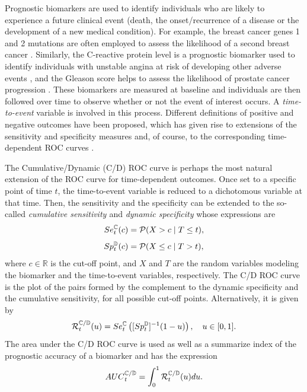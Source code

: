 Prognostic biomarkers are used to identify individuals who are likely to experience a future clinical event (death, the onset/recurrence of a disease or the development of a new medical condition). For example, the breast cancer genes 1 and 2 mutations are often employed to assess the likelihood of a second breast cancer \citep{Basu2015}. Similarly, the C-reactive protein level is a prognostic biomarker used to identify individuals with unstable angina at risk of developing other adverse events \citep{Ferreiros1999}, and the Gleason score helps to assess the likelihood of prostate cancer progression \citep{Epstein2016}. These biomarkers are measured at baseline and individuals are then followed over time to observe whether or not the event of interest occurs. 
A {\it{time-to-event}} variable is involved in this process. Different definitions of positive and negative outcomes have been proposed, which has given rise to extensions of the sensitivity and specificity measures and, of course, to the corresponding time-dependent ROC curves \citep{Etzioni99} .

The Cumulative/Dynamic (C/D) ROC curve \citep{Heagerty2000} is perhaps the most natural extension of the ROC curve for time-dependent outcomes. Once set to a specific point of time $t$, the time-to-event variable is reduced to a dichotomous variable at that time. Then, the sensitivity and the specificity can be extended to the so-called {\it {cumulative sensitivity }} and {\it{dynamic specificity}} whose expressions are 
\begin{equation*}
Se_{t}^{\mathbb{C}}(c) = {\cal{P}}(X > c \;| \; T \leq t),
\end{equation*}
\begin{equation*}
Sp_{t}^{\mathbb{D}}(c) = {\cal{P}}(X \leq c \;| \; T > t),
\end{equation*}
where $c \in \mathbb{R}$ is the cut-off point, and $X$ and $T$ are the random variables modeling the biomarker and the time-to-event variables, respectively. The C/D ROC curve is the plot of the pairs formed by the complement to the dynamic specificity and the cumulative sensitivity, for all possible cut-off points. Alternatively, it is given by
\begin{equation*}
{\cal R}_{t}^{{\mathbb{C}}/{\mathbb{D}}}(u)= Se_{t}^{\mathbb{C}}\left([Sp_{t}^{\mathbb{D}}]^{-1}(1-u)\right), \quad u \in[0,1].	
\end{equation*}
The area under the C/D ROC curve is used as well as a summarize index of the prognostic accuracy of a biomarker and has the expression
\begin{equation*}
{AUC}_{t}^{\mathbb{C}/\mathbb{D}} = \int_{0}^{1}{{\cal R}_{t}^{{\mathbb{C}}/{\mathbb{D}}}(u)du}.
\end{equation*}

